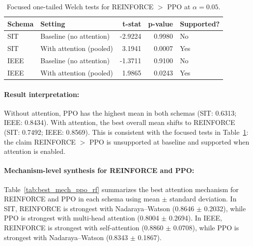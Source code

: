 \documentclass[sn-basic]{sn-jnl}%
\begin{document}
\begin{table}[htbp]
	\centering
	\caption{Focused one-tailed Welch tests for \textsc{REINFORCE} $>$ \textsc{PPO} at $\alpha=0.05$.}
	\label{tab:rf_vs_ppo_tests}
	\begin{tabular}{l l r r l}
	\toprule
	\textbf{Schema} & \textbf{Setting} & \textbf{t-stat} & \textbf{p-value} & \textbf{Supported?}\\
	\midrule
	SIT & Baseline (no attention) & -2.9224 & 0.9980 & No\\
	SIT & With attention (pooled) & 3.1941 & 0.0007 & Yes\\
	IEEE & Baseline (no attention) & -1.3711 & 0.9100 & No\\
	IEEE & With attention (pooled) & 1.9865 & 0.0243 & Yes\\
	\bottomrule
	\end{tabular}
\end{table}

\paragraph{Result interpretation:}
Without attention, \textsc{PPO} has the highest mean in both schemas (SIT: 0.6313; IEEE: 0.8434). With attention, the best overall mean shifts to \textsc{REINFORCE} (SIT: 0.7492; IEEE: 0.8569). This is consistent with the focused tests in Table~\ref{tab:rf_vs_ppo_tests}: the claim \textsc{REINFORCE} $>$ \textsc{PPO} is unsupported at baseline and supported when attention is enabled.

\paragraph{Mechanism-level synthesis for \textsc{REINFORCE} and \textsc{PPO}:}
Table~\ref{tab:best_mech_ppo_rf} summarizes the best attention mechanism for \textsc{REINFORCE} and \textsc{PPO} in each schema using mean $\pm$ standard deviation. In SIT, \textsc{REINFORCE} is strongest with Nadaraya--Watson (0.8646 $\pm$ 0.2032), while \textsc{PPO} is strongest with multi-head attention (0.8004 $\pm$ 0.2694). In IEEE, \textsc{REINFORCE} is strongest with self-attention (0.8860 $\pm$ 0.0708), while \textsc{PPO} is strongest with Nadaraya--Watson (0.8343 $\pm$ 0.1867).
\end{document}
